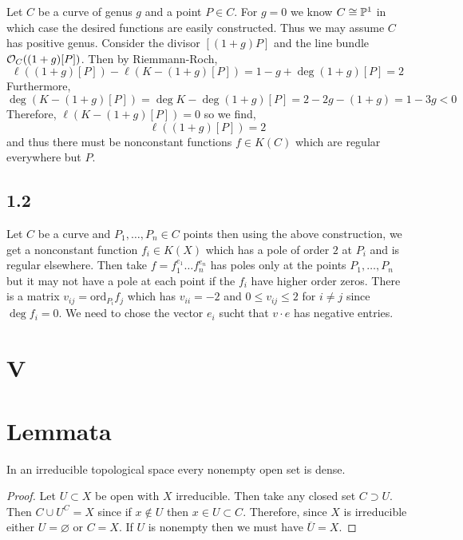 \documentclass[12pt]{article}
\begin{document}
Let $C$ be a curve of genus $g$ and a point $P \in C$. For $g = 0$ we know $C \cong \P^1$ in which case the desired functions are easily constructed. Thus we may assume $C$ has positive genus. Consider the divisor $[(1 + g)P]$ and the line bundle $\struct{C}((1 + g)[P])$. Then by Riemmann-Roch,
\[ \ell((1 + g)[P]) - \ell(K - (1 + g)[P]) = 1 - g + \deg{(1 + g) [P]} = 2 \]
Furthermore,
\[ \deg{(K - (1+g)[P])} = \deg{K} - \deg{(1 + g)[P]} = 2 - 2g - (1 + g) = 1 - 3 g < 0 \]
Therefore, $\ell(K - (1 + g)[P]) = 0$ so we find,
\[ \ell((1 + g)[P]) = 2 \]
and thus there must be nonconstant functions $f \in K(C)$ which are regular everywhere but $P$. 

\subsection{1.2}

Let $C$ be a curve and $P_1, \dots, P_n \in C$ points then using the above construction, we get a nonconstant function $f_i \in K(X)$ which has a pole of order $2$ at $P_i$ and is regular elsewhere. Then take $f = f_1^{e_1} \dots f_n^{e_n}$ has poles only at the points $P_1, \dots, P_n$ but it may not have a pole at each point if the $f_i$ have higher order zeros. There is a matrix $v_{ij} = \mathrm{ord}_{P_i} f_j$ which has $v_{ii} = -2$ and $0 \le v_{ij} \le 2$ for $i \neq j$ since $\deg{f_i} = 0$. We need to chose the vector $e_i$ sucht that $v \cdot e$ has negative entries. 

\section{V}

\section{Lemmata}


\begin{lemma} \label{open_in_irreducible_is_dense}
In an irreducible topological space every nonempty open set is dense.
\end{lemma}

\begin{proof}
Let $U \subset X$ be open with $X$ irreducible. Then take any closed set $C \supset U$. Then $C \cup U^C = X$ since if $x \notin U$ then $x \in U \subset C$. Therefore, since $X$ is irreducible either $U = \varnothing$ or $C = X$. If $U$ is nonempty then we must have $\overline{U} = X$.  
\end{proof}
\end{document}
